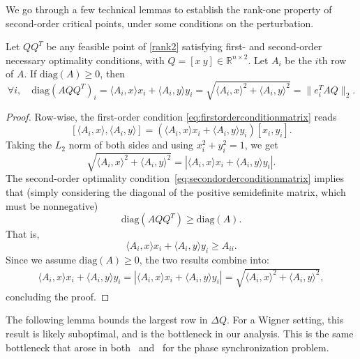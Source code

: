\documentclass{colt2016} %
\newcommand{\diag}{\mathrm{diag}}
\newcommand{\1}{\mathbf{1}}
\begin{document}
We go through a few technical lemmas to establish the rank-one property of second-order critical points, under some conditions on the perturbation.
\begin{lemma}\label{lem: MaxCutOptimality}
	Let $QQ^T$ be any feasible point of \eqref{rank2} satisfying first- and second-order necessary optimality conditions, with $Q = [x\ y] \in \mathbb{R}^{n\times 2}$. Let $A_i$ be the $i$th row of $A$. If $\diag(A) \geq 0$, then
	\[
	\forall i, \quad \diag(AQQ^T)_i = \langle A_i, x \rangle x_i + \langle A_i, y \rangle y_i = \sqrt{ \langle A_i, x\rangle ^2 + \langle A_i, y \rangle^2 } = \|e_i^TAQ\|_2.
	\]
\end{lemma}
\begin{proof}
	Row-wise, the first-order condition \eqref{eq:firstorderconditionmatrix} reads
	\[
	\left [ \langle A_i, x \rangle, \langle A_i, y \rangle \right] = \left( \langle A_i, x\rangle x_i + \langle A_i, y \rangle y_i \right) \left[x_i, y_i \right].
	\]
	Taking the $L_2$ norm of both sides and using $x_i^2 + y_i^2 = 1$, we get
	\[
	\sqrt{ \langle A_i, x\rangle ^2 + \langle A_i, y \rangle^2 } = \left| \langle A_i, x \rangle x_i + \langle A_i, y \rangle y_i \right|.
	\]
	The second-order optimality condition~\eqref{eq:secondorderconditionmatrix} implies that (simply considering the diagonal of the positive semidefinite matrix, which must be nonnegative)
	\[
	\diag(AQQ^T) \geq \diag(A).
	\]
	That is,
	\[
	\langle A_i, x \rangle x_i + \langle A_i, y \rangle y_i  \geq A_{ii}.
	\]
	Since we assume $\diag(A) \geq 0$, the two results combine into:
	\begin{align}
	\langle A_i, x \rangle x_i + \langle A_i, y \rangle y_i = \left| \langle A_i, x \rangle x_i + \langle A_i, y \rangle y_i \right| = \sqrt{ \langle A_i, x\rangle ^2 + \langle A_i, y \rangle^2 },
	\end{align}
	concluding the proof.
\end{proof}
%
%
The following lemma bounds the largest row in $\Delta Q$. For a Wigner setting, this result is likely suboptimal, and is the bottleneck in our analysis. This is the same bottleneck that arose in both~\citep{bandeira2014tightness} and~\citep{boumal2016nonconvexphase} for the phase synchronization problem.
\end{document}
